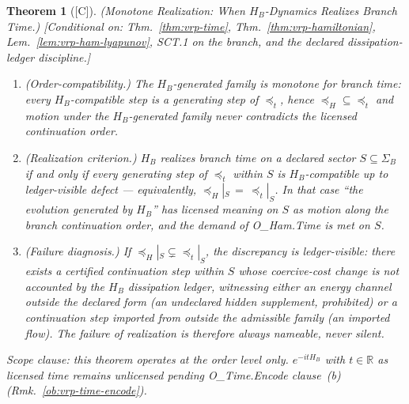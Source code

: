 \documentclass[12pt,oneside]{amsbook}
\theoremstyle{plain}
\newtheorem{theorem}{Theorem}[section]
\theoremstyle{definition}
\theoremstyle{remark}
\newcommand{\status}[1]{\textup{[#1]}}
\begin{document}
\begin{theorem}[\status{C}]\label{thm:vrp-ham-time-realization}
\textup{(Monotone Realization: When $H_B$-Dynamics Realizes Branch
Time.)}
\textup{[Conditional on: Thm.~\ref{thm:vrp-time},
Thm.~\ref{thm:vrp-hamiltonian},
Lem.~\ref{lem:vrp-ham-lyapunov}, SCT.1 on the branch, and the
declared dissipation-ledger discipline.]}
\begin{enumerate}[label=\textup{(\arabic*)}]
  \item \emph{(Order-compatibility.)}  The $H_B$-generated family
    is monotone for branch time: every $H_B$-compatible step is a
    generating step of $\preceq_t$, hence
    $\preceq_H \subseteq \preceq_t$ and motion under the
    $H_B$-generated family never contradicts the licensed
    continuation order.
  \item \emph{(Realization criterion.)}  $H_B$ \emph{realizes}
    branch time on a declared sector $S \subseteq \Sigma_B$ if and
    only if every generating step of $\preceq_t$ within $S$ is
    $H_B$-compatible up to ledger-visible defect --- equivalently,
    $\preceq_H|_S \,=\, \preceq_t|_S$.  In that case
    ``the evolution generated by $H_B$'' has licensed meaning on
    $S$ as motion along the branch continuation order, and the
    demand of O\_Ham.Time is met on $S$.
  \item \emph{(Failure diagnosis.)}  If
    $\preceq_H|_S \subsetneq \preceq_t|_S$, the discrepancy is
    ledger-visible: there exists a certified continuation step
    within $S$ whose coercive-cost change is not accounted by the
    $H_B$ dissipation ledger, witnessing either an energy channel
    outside the declared form (an undeclared hidden supplement,
    prohibited) or a continuation step imported from outside the
    admissible family (an imported flow).  The failure of
    realization is therefore always nameable, never silent.
\end{enumerate}
\emph{Scope clause:} this theorem operates at the order level
only.  $e^{-itH_B}$ with $t \in \mathbb{R}$ as licensed time
remains unlicensed pending O\_Time.Encode clause~(b)
(Rmk.~\ref{ob:vrp-time-encode}).
\end{theorem}
\end{document}
